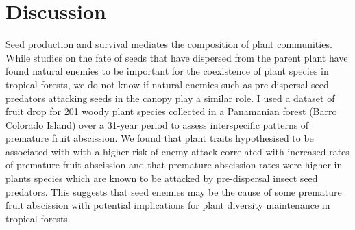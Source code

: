 
\section{Discussion}
Seed production and survival mediates the composition of plant communities. While studies on the fate of seeds that have dispersed from the parent plant have found natural enemies to be important for the coexistence of plant species in tropical forests, we do not know if natural enemies such as pre-dispersal seed predators attacking seeds in the canopy play a similar role. I used a dataset of fruit drop for 201 woody plant species collected in a Panamanian forest (Barro Colorado Island) over a 31-year period to assess interspecific patterns of premature fruit abscission. We found that plant traits hypothesised to be associated with with a higher risk of enemy attack correlated with increased rates of premature fruit abscission and that premature abscission rates were higher in plants species which are known to be attacked by pre-dispersal insect seed predators. This suggests that seed enemies may be the cause of some premature fruit abscission with potential implications for plant diversity maintenance in tropical forests.

